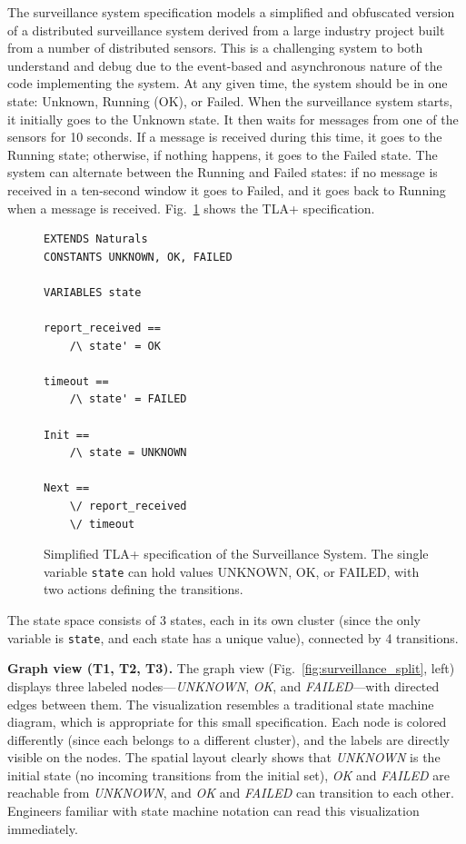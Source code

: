 \documentclass[conference]{IEEEtran}
\begin{document}
The surveillance system specification models a simplified and obfuscated version of a distributed surveillance system derived from a large industry project built from a number of distributed sensors. This is a challenging system to both understand and debug due to the event-based and asynchronous nature of the code implementing the system. At any given time, the system should be in one state: Unknown, Running (OK), or Failed. When the surveillance system starts, it initially goes to the Unknown state. It then waits for messages from one of the sensors for 10 seconds. If a message is received during this time, it goes to the Running state; otherwise, if nothing happens, it goes to the Failed state. The system can alternate between the Running and Failed states: if no message is received in a ten-second window it goes to Failed, and it goes back to Running when a message is received. Fig.~\ref{fig:surveillance_spec} shows the TLA+ specification.

\begin{figure}[t]
\begin{lstlisting}[language={},morekeywords={EXTENDS,CONSTANTS,VARIABLES,Init,Next}]
EXTENDS Naturals
CONSTANTS UNKNOWN, OK, FAILED

VARIABLES state

report_received ==
    /\ state' = OK

timeout ==
    /\ state' = FAILED

Init ==
    /\ state = UNKNOWN

Next ==
    \/ report_received
    \/ timeout
\end{lstlisting}
\caption{Simplified TLA+ specification of the Surveillance System. The single variable \texttt{state} can hold values UNKNOWN, OK, or FAILED, with two actions defining the transitions.}
\label{fig:surveillance_spec}
\end{figure}

The state space consists of 3 states, each in its own cluster (since the only variable is \texttt{state}, and each state has a unique value), connected by 4 transitions.

\textbf{Graph view (T1, T2, T3).} The graph view (Fig.~\ref{fig:surveillance_split}, left) displays three labeled nodes---\textit{UNKNOWN}, \textit{OK}, and \textit{FAILED}---with directed edges between them. The visualization resembles a traditional state machine diagram, which is appropriate for this small specification. Each node is colored differently (since each belongs to a different cluster), and the labels are directly visible on the nodes. The spatial layout clearly shows that \textit{UNKNOWN} is the initial state (no incoming transitions from the initial set), \textit{OK} and \textit{FAILED} are reachable from \textit{UNKNOWN}, and \textit{OK} and \textit{FAILED} can transition to each other. Engineers familiar with state machine notation can read this visualization immediately.
\end{document}
